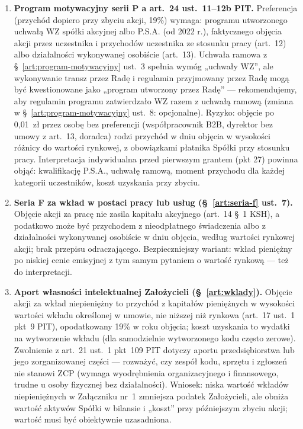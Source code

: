 \documentclass[12pt,a4paper]{report}
\begin{document}
\begin{enumerate}
  \item \textbf{Program motywacyjny serii P a art.~24 ust.~11--12b PIT.} Preferencja (przychód dopiero przy zbyciu akcji, 19\%) wymaga: programu utworzonego uchwałą WZ spółki akcyjnej albo P.S.A. (od 2022 r.), faktycznego objęcia akcji przez uczestnika i przychodów uczestnika ze stosunku pracy (art.~12) albo działalności wykonywanej osobiście (art.~13). Uchwała ramowa z §~\ref{art:program-motywacyjny} ust.~3 spełnia wymóg „uchwały WZ”, ale wykonywanie transz przez Radę i regulamin przyjmowany przez Radę mogą być kwestionowane jako „program utworzony przez Radę” --- rekomendujemy, aby regulamin programu zatwierdzało WZ razem z uchwałą ramową (zmiana w §~\ref{art:program-motywacyjny} ust.~8: opcjonalne). Ryzyko: objęcie po 0,01~zł przez osobę bez preferencji (współpracownik B2B, dyrektor bez umowy z art.~13, doradca) rodzi przychód w dniu objęcia w wysokości różnicy do wartości rynkowej, z obowiązkami płatnika Spółki przy stosunku pracy. Interpretacja indywidualna przed pierwszym grantem (pkt 27) powinna objąć: kwalifikację P.S.A., uchwałę ramową, moment przychodu dla każdej kategorii uczestników, koszt uzyskania przy zbyciu.
  \item \textbf{Seria F za wkład w postaci pracy lub usług (§~\ref{art:seria-f} ust.~7).} Objęcie akcji za pracę nie zasila kapitału akcyjnego (art.~14 §~1 KSH), a podatkowo może być przychodem z nieodpłatnego świadczenia albo z działalności wykonywanej osobiście w dniu objęcia, według wartości rynkowej akcji; brak przepisu odraczającego. Bezpieczniejszy wariant: wkład pieniężny po niskiej cenie emisyjnej z tym samym pytaniem o wartość rynkową --- też do interpretacji.
  \item \textbf{Aport własności intelektualnej Założycieli (§~\ref{art:wklady}).} Objęcie akcji za wkład niepieniężny to przychód z kapitałów pieniężnych w wysokości wartości wkładu określonej w umowie, nie niższej niż rynkowa (art.~17 ust.~1 pkt~9 PIT), opodatkowany 19\% w roku objęcia; koszt uzyskania to wydatki na wytworzenie wkładu (dla samodzielnie wytworzonego kodu często zerowe). Zwolnienie z art.~21 ust.~1 pkt~109 PIT dotyczy aportu przedsiębiorstwa lub jego zorganizowanej części --- rozważyć, czy zespół kodu, sprzętu i zgłoszeń nie stanowi ZCP (wymaga wyodrębnienia organizacyjnego i finansowego, trudne u osoby fizycznej bez działalności). Wniosek: niska wartość wkładów niepieniężnych w Załączniku nr~1 zmniejsza podatek Założycieli, ale obniża wartość aktywów Spółki w bilansie i „koszt” przy późniejszym zbyciu akcji; wartość musi być obiektywnie uzasadniona.

\end{enumerate}
\end{document}
